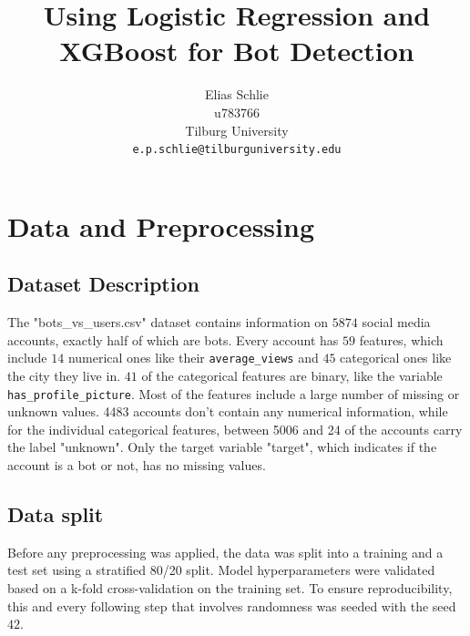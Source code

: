 \documentclass[twocolumn]{article}
\title{Using Logistic Regression and XGBoost for Bot Detection}
\author{
 Elias Schlie \\
 u783766 \\
 Tilburg University \\
  \texttt{e.p.schlie@tilburguniversity.edu}
}
\date{}
\begin{document}

\section{Data and Preprocessing}

\subsection{Dataset Description}

The 
"bots\_vs\_users.csv" dataset contains information on $5874$ social media accounts, exactly half of which are bots. Every account has $59$ features, which include $14$ numerical ones like their \texttt{average\_views} and $45$ categorical ones like the city they live in. $41$ of the categorical features are binary, like the variable \texttt{has\_profile\_picture}.
Most of the features include a large number of missing or unknown values. 4483 accounts don't contain any numerical information, while for the individual categorical features, between 5006 and 24 of the accounts carry the label "unknown".
Only the target variable "target", which indicates if the account is a bot or not, has no missing values.

\subsection{Data split}

Before any preprocessing was applied, the data was split into a training and a test set using a stratified 80/20 split. Model hyperparameters were validated based on a k-fold cross-validation on the training set. To ensure reproducibility, this and every following step that involves randomness was seeded with the seed $42$.
\end{document}

